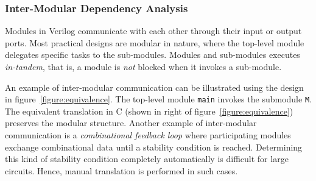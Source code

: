 %
%
\subsubsection{Inter-Modular Dependency Analysis}
%
Modules in Verilog communicate with each other through their input or output
ports. Most practical designs are modular in nature, where the top-level 
module delegates specific tasks to the sub-modules.
Modules and sub-modules executes \emph{in-tandem}, that is, a
module is \emph{not} blocked when it invokes a sub-module. 


An example of inter-modular communication can be illustrated
using the design in figure~\ref{figure:equivalence}.  The top-level 
module \texttt{main} invokes the submodule \texttt{M}.  
The equivalent translation in C (shown in right of figure~\ref{figure:equivalence}) 
preserves the modular structure. 
%
Another example of inter-modular communication is a \emph{combinational feedback loop} 
where participating modules exchange combinational data until a stability condition is reached.  
%
Determining this kind of stability condition completely automatically 
is difficult for large circuits.  Hence, manual translation is performed in such cases.
%  
